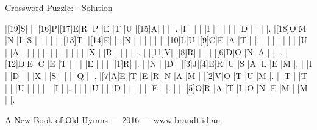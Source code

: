 \documentclass[12pt]{article}
\begin{document}
\begin{center}
  \huge{Crossword Puzzle: - Solution}
\end{center}
\vspace{1.5cm}
\PuzzleSolution
\begin{Puzzle}{15}{15}
  |[19]S|{}  |{}  |[16]P|[17]E|R   |P   |E   |T   |U   |[15]A|{}  |{}  |{}  |.
  |I   |{}  |{}  |{}  |I   |{}  |{}  |{}  |{}  |{}  |D   |{}  |{}  |{}  |.
  |[18]O|M   |N   |I   |S   |{}  |{}  |{}  |{}  |{}  |[13]T|{}  |[14]E|{}  |.
  |N   |{}  |{}  |{}  |{}  |{}  |{}  |[10]L|U   |[9]C|E   |A   |T   |{}  |.
  |{}  |{}  |{}  |{}  |{}  |{}  |{}  |U   |{}  |A   |{}  |{}  |{}  |{}  |.
  |{}  |{}  |{}  |{}  |{}  |{}  |{}  |X   |{}  |R   |{}  |{}  |{}  |{}  |.
  |{}  |[11]V|{}  |[8]R|{}  |{}  |{}  |{}  |[6]D|O   |N   |A   |{}  |{}  |.
  |[12]D|E   |C   |E   |T   |{}  |{}  |{}  |E   |{}  |{}  |{}  |[1]R|{}  |.
  |{}  |N   |{}  |D   |{}  |[3]J|[4]E|R   |U   |S   |A   |L   |E   |M   |.
  |{}  |I   |{}  |D   |{}  |{}  |X   |{}  |S   |{}  |{}  |{}  |Q   |{}  |.
  |[7]A|E   |T   |E   |R   |N   |A   |M   |{}  |[2]V|O   |T   |U   |M   |.
  |{}  |T   |{}  |T   |{}  |{}  |U   |{}  |{}  |{}  |{}  |{}  |I   |{}  |.
  |{}  |{}  |{}  |U   |{}  |{}  |D   |{}  |{}  |{}  |{}  |{}  |E   |{}  |.
  |{}  |{}  |[5]O|R   |A   |T   |I   |O   |N   |E   |M   |{}  |M   |{}  |.
\end{Puzzle}

\bigskip

\vfill

\centerline{A New Book of Old Hymns --- 2016 --- www.brandt.id.au}
\eject
\end{document}
